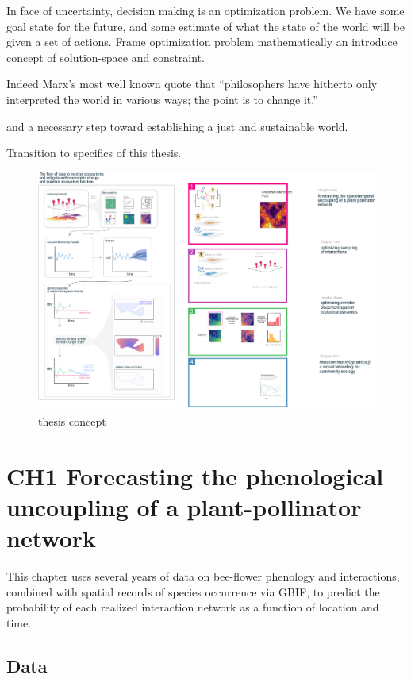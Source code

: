 \documentclass[10pt,oneside]{article}
\makeatletter
\def\maxwidth{\ifdim\Gin@nat@width>\linewidth\linewidth
\else\Gin@nat@width\fi}
\let\Oldincludegraphics\includegraphics
\renewcommand{\includegraphics}[1]{\Oldincludegraphics[width=\maxwidth]{#1}}
\makeatother
\begin{document}
In face of uncertainty, decision making is an optimization problem. We
have some goal state for the future, and some estimate of what the state
of the world will be given a set of actions. Frame optimization problem
mathematically an introduce concept of solution-space and constraint.

Indeed Marx's most well known quote that ``philosophers have hitherto
only interpreted the world in various ways; the point is to change it.''

and a necessary step toward establishing a just and sustainable world.

Transition to specifics of this thesis.

\begin{figure}
\centering
\includegraphics{./figures/thesisconcept.png}
\caption{thesis concept}
\end{figure}

\hypertarget{ch1-forecasting-the-phenological-uncoupling-of-a-plant-pollinator-network}{%
\section{CH1 Forecasting the phenological uncoupling of a
plant-pollinator
network}\label{ch1-forecasting-the-phenological-uncoupling-of-a-plant-pollinator-network}}

This chapter uses several years of data on bee-flower phenology and
interactions, combined with spatial records of species occurrence via
GBIF, to predict the probability of each realized interaction network as
a function of location and time.

\hypertarget{data}{%
\subsection{Data}\label{data}}
\end{document}
